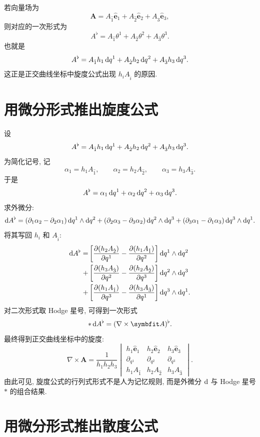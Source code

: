 若向量场为
\[
\bm{A}
=
A_{\hat 1}\hat{\bm{e}}_1
+
A_{\hat 2}\hat{\bm{e}}_2
+
A_{\hat 3}\hat{\bm{e}}_3,
\]
则对应的一次形式为
\[
A^\flat
=
A_{\hat 1}\theta^1
+
A_{\hat 2}\theta^2
+
A_{\hat 3}\theta^3.
\]
也就是
\[
A^\flat
=
A_{\hat 1}h_1\mathop{}\!\mathrm{d} q^1
+
A_{\hat 2}h_2\mathop{}\!\mathrm{d} q^2
+
A_{\hat 3}h_3\mathop{}\!\mathrm{d} q^3.
\]
这正是正交曲线坐标中旋度公式出现 $h_iA_{\hat i}$ 的原因. 

\section{用微分形式推出旋度公式}

设
\[
A^\flat
=
A_{\hat 1}h_1\mathop{}\!\mathrm{d} q^1
+
A_{\hat 2}h_2\mathop{}\!\mathrm{d} q^2
+
A_{\hat 3}h_3\mathop{}\!\mathrm{d} q^3.
\]
为简化记号, 记
\[
\alpha_1=h_1A_{\hat 1},
\qquad
\alpha_2=h_2A_{\hat 2},
\qquad
\alpha_3=h_3A_{\hat 3}.
\]
于是
\[
A^\flat
=
\alpha_1\mathop{}\!\mathrm{d} q^1+\alpha_2\mathop{}\!\mathrm{d} q^2+\alpha_3\mathop{}\!\mathrm{d} q^3.
\]
求外微分: 
\[
\mathop{}\!\mathrm{d} A^\flat
=
(\partial_1\alpha_2-\partial_2\alpha_1)\mathop{}\!\mathrm{d} q^1\wedge \mathop{}\!\mathrm{d} q^2
+
(\partial_2\alpha_3-\partial_3\alpha_2)\mathop{}\!\mathrm{d} q^2\wedge \mathop{}\!\mathrm{d} q^3
+
(\partial_3\alpha_1-\partial_1\alpha_3)\mathop{}\!\mathrm{d} q^3\wedge \mathop{}\!\mathrm{d} q^1.
\]
将其写回 $h_i$ 和 $A_{\hat i}$: 
\[
\begin{aligned}
	\mathop{}\!\mathrm{d} A^\flat
	=
	&\left[
	\frac{\partial(h_2A_{\hat 2})}{\partial q^1}
	-
	\frac{\partial(h_1A_{\hat 1})}{\partial q^2}
	\right]\mathop{}\!\mathrm{d} q^1\wedge \mathop{}\!\mathrm{d} q^2\\
	+
	&\left[
	\frac{\partial(h_3A_{\hat 3})}{\partial q^2}
	-
	\frac{\partial(h_2A_{\hat 2})}{\partial q^3}
	\right]\mathop{}\!\mathrm{d} q^2\wedge \mathop{}\!\mathrm{d} q^3\\
	+
	&\left[
	\frac{\partial(h_1A_{\hat 1})}{\partial q^3}
	-
	\frac{\partial(h_3A_{\hat 3})}{\partial q^1}
	\right]\mathop{}\!\mathrm{d} q^3\wedge \mathop{}\!\mathrm{d} q^1.
\end{aligned}
\]
对二次形式取 Hodge 星号, 可得到一次形式
\[
*\dif A^\flat=(\nabla\times\bm{A})^\flat.
\]
最终得到正交曲线坐标中的旋度: 
\[
\nabla\times\bm{A}
=
\frac{1}{h_1h_2h_3}
\begin{vmatrix}
h_1\hat{\bm{e}}_1 & h_2\hat{\bm{e}}_2 & h_3\hat{\bm{e}}_3\\
\partial_{q^1} & \partial_{q^2} & \partial_{q^3}\\
h_1A_{\hat 1} & h_2A_{\hat 2} & h_3A_{\hat 3}
\end{vmatrix}.
\]
由此可见, 旋度公式的行列式形式不是人为记忆规则, 而是外微分 $\mathop{}\!\mathrm{d}$ 与 Hodge 星号 $*$ 的组合结果. 

\section{用微分形式推出散度公式}

